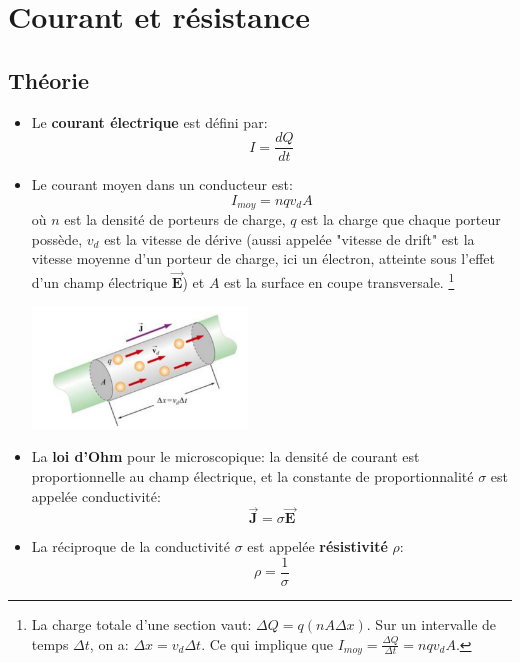 \documentclass[a4paper]{article}
\renewcommand{\thefootnote}{\*}
\begin{document}
\section{Courant et résistance}









\subsection{Théorie}






\renewcommand{\thefootnote}{\arabic{footnote}}
\begin{itemize}
    \item Le \textbf{courant électrique} est défini par: \[ I = \frac{d Q}{d t} \]
    \item Le courant moyen dans un conducteur est: \[ I_{moy} = n q v_d A \]
où $ n $ est la densité de porteurs de charge, $ q $ est la charge que chaque porteur possède, $ v_d $ est la vitesse de dérive (aussi appelée "vitesse de drift" est la vitesse moyenne d'un porteur de charge, ici un électron, atteinte sous l'effet d'un champ électrique $ \vec{\textbf{E}} $) et $ A $ est la surface en coupe transversale. \footnote{La charge totale d'une section vaut: $\displaystyle \Delta Q = q (n A \Delta x) $. Sur un intervalle de temps $ \Delta t $, on a: $ \Delta x = v_d \Delta t $. Ce qui implique que $\displaystyle I_{moy} = \frac{\Delta Q}{\Delta t} = n q v_d A $.}
\begin{center} \includegraphics[width = 0.45\textwidth]{CourantNote.PNG} \end{center}
    \item La \textbf{loi d'Ohm} pour le microscopique: la densité de courant est proportionnelle au champ électrique, et la constante de 
proportionnalité $ \sigma $ est appelée conductivité: \[ \vec{\textbf{J}} = \sigma \vec{\textbf{E}} \]
    \item La réciproque de la conductivité $ \sigma $ est appelée \textbf{résistivité} $ \rho $: \[ \rho = \frac{1}{\sigma} \]

\end{itemize}
\end{document}
